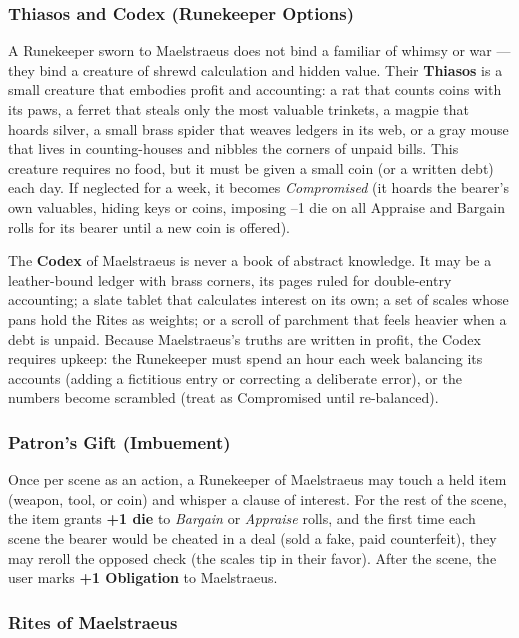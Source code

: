 \subsubsection*{Thiasos and Codex (Runekeeper Options)}

A Runekeeper sworn to Maelstraeus does not bind a familiar of whimsy or war --- they bind a creature of shrewd calculation and hidden value. Their \textbf{Thiasos} is a small creature that embodies profit and accounting: a rat that counts coins with its paws, a ferret that steals only the most valuable trinkets, a magpie that hoards silver, a small brass spider that weaves ledgers in its web, or a gray mouse that lives in counting-houses and nibbles the corners of unpaid bills. This creature requires no food, but it must be given a small coin (or a written debt) each day. If neglected for a week, it becomes \textit{Compromised} (it hoards the bearer's own valuables, hiding keys or coins, imposing --1 die on all Appraise and Bargain rolls for its bearer until a new coin is offered).

The \textbf{Codex} of Maelstraeus is never a book of abstract knowledge. It may be a leather-bound ledger with brass corners, its pages ruled for double-entry accounting; a slate tablet that calculates interest on its own; a set of scales whose pans hold the Rites as weights; or a scroll of parchment that feels heavier when a debt is unpaid. Because Maelstraeus's truths are written in profit, the Codex requires upkeep: the Runekeeper must spend an hour each week balancing its accounts (adding a fictitious entry or correcting a deliberate error), or the numbers become scrambled (treat as Compromised until re-balanced).

\subsubsection*{Patron's Gift (Imbuement)}

Once per scene as an action, a Runekeeper of Maelstraeus may touch a held item (weapon, tool, or coin) and whisper a clause of interest. For the rest of the scene, the item grants \textbf{+1 die} to \textit{Bargain} or \textit{Appraise} rolls, and the first time each scene the bearer would be cheated in a deal (sold a fake, paid counterfeit), they may reroll the opposed check (the scales tip in their favor). After the scene, the user marks \textbf{+1 Obligation} to Maelstraeus.

\subsubsection*{Rites of Maelstraeus}

